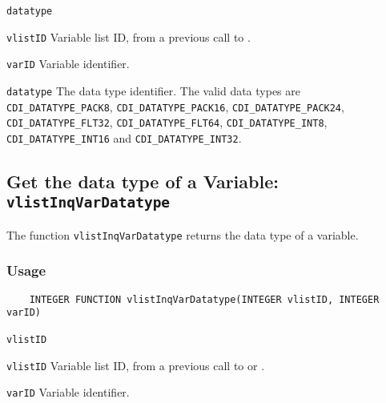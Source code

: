 \hspace*{4mm}\begin{minipage}[]{15cm}
\begin{deflist}{\texttt{datatype}\ }
\item[\texttt{vlistID}]
Variable list ID, from a previous call to {}.
\item[\texttt{varID}]
Variable identifier.
\item[\texttt{datatype}]
The data type identifier.
                    The valid {\CDI} data types are {\texttt{CDI\_DATATYPE\_PACK8}}, {\texttt{CDI\_DATATYPE\_PACK16}},
                    {\texttt{CDI\_DATATYPE\_PACK24}}, {\texttt{CDI\_DATATYPE\_FLT32}}, {\texttt{CDI\_DATATYPE\_FLT64}},
                    {\texttt{CDI\_DATATYPE\_INT8}}, {\texttt{CDI\_DATATYPE\_INT16}} and {\texttt{CDI\_DATATYPE\_INT32}}.

\end{deflist}
\end{minipage}


\subsection{Get the data type of a Variable: \texttt{vlistInqVarDatatype}}
\label{vlistInqVarDatatype}

The function {\texttt{vlistInqVarDatatype}} returns the data type of a variable.

\subsubsection*{Usage}

\begin{verbatim}
    INTEGER FUNCTION vlistInqVarDatatype(INTEGER vlistID, INTEGER varID)
\end{verbatim}

\hspace*{4mm}\begin{minipage}[]{15cm}
\begin{deflist}{\texttt{vlistID}\ }
\item[\texttt{vlistID}]
Variable list ID, from a previous call to {} or {}.
\item[\texttt{varID}]
Variable identifier.

\end{deflist}
\end{minipage}

